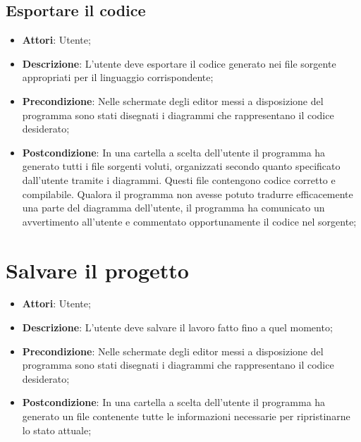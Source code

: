 \documentclass[../AnalisiDeiRequisiti.tex]{subfiles}
\begin{document}
	\subsection{Esportare il codice}
	\begin{itemize}
		\item \textbf{Attori}: Utente;
		\item \textbf{Descrizione}: L'utente deve esportare il codice generato nei file sorgente appropriati per il linguaggio corrispondente;
		\item \textbf{Precondizione}: Nelle schermate degli editor messi a disposizione del programma sono stati disegnati i diagrammi che rappresentano il codice desiderato;
		\item \textbf{Postcondizione}: In una cartella a scelta dell'utente il programma ha generato tutti i file sorgenti voluti, organizzati secondo quanto specificato dall'utente tramite i diagrammi. Questi file contengono codice corretto e compilabile. Qualora il programma non avesse potuto tradurre efficacemente una parte del diagramma dell'utente, il programma ha comunicato un avvertimento all'utente e commentato opportunamente il codice nel sorgente;
	\end{itemize}
	
	\section{Salvare il progetto}
	\begin{itemize}
		\item \textbf{Attori}: Utente;
		\item \textbf{Descrizione}: L'utente deve salvare il lavoro fatto fino a quel momento;
		\item \textbf{Precondizione}: Nelle schermate degli editor messi a disposizione del programma sono stati disegnati i diagrammi che rappresentano il codice desiderato;
		\item \textbf{Postcondizione}: In una cartella a scelta dell'utente il programma ha generato un file contenente tutte le informazioni necessarie per ripristinarne lo stato attuale;
	\end{itemize}	
	
\end{document}
